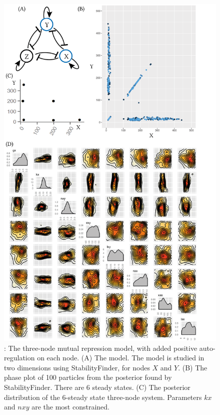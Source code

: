 \begin{figure}[h]
\begin{center}
\includegraphics[scale=0.6]{../../chapters/chapterStabilityFinder/images/lu_6ss.png}
\caption[The three-node mutual repression model, with added positive auto-regulation on each node.]{ \label{fig:fig8}: The three-node mutual repression model, with added positive auto-regulation on each node. (A) The model. The model is studied in two dimensions using StabilityFinder, for nodes $X$ and $Y$. (B) The phase plot of 100 particles from the posterior found by StabilityFinder. There are 6 steady states. (C) The posterior distribution of the 6-steady state three-node system. Parameters $kx$ and $nxy$ are the most constrained.}
\end{center}
\end{figure}


